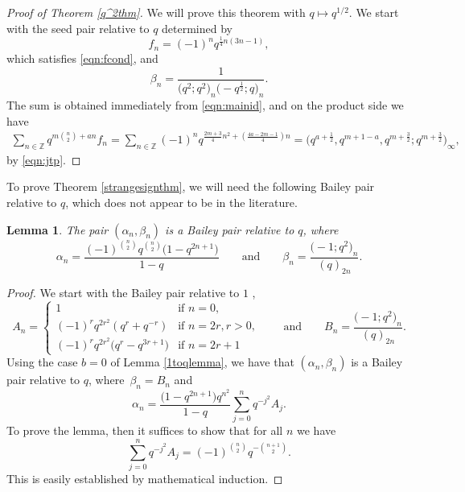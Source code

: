 \documentclass[pdftex]{sigma}
\newtheorem{Lemma}[Theorem]{Lemma}
\numberwithin{equation}{section}
\newcommand{\ZZ}{\mathbb{Z}}
\begin{document}
\begin{proof}[Proof of Theorem \ref{q^2thm}]
	We will prove this theorem with $q\mapsto q^{1/2}$.
	We start with the seed pair relative to $q$ \cite[equation~(4.4)]{Wa1} determined by
	\begin{equation} \label{eqn:fn2}
		f_n = (-1)^nq^{\frac{1}{4}n(3n-1)},
	\end{equation}
	which satisfies \eqref{eqn:fcond},
	and
	\begin{equation*}
		\beta_n = \frac{1}{\bigl(q^2;q^2\bigr)_n\bigl(-q^{\frac{1}{2}};q\bigr)_n}.
	\end{equation*}
	The sum is obtained immediately from \eqref{eqn:mainid}, and on the product side we have
	\begin{align*}
		\sum_{n\in\ZZ}q^{m\binom{n}{2}+an}f_n =
		\sum_{n\in\ZZ}(-1)^nq^{\frac{2m+3}{4}n^2+(\frac{4a-2m-1}{4})n }
		 =\bigl( q^{a+\frac{1}{2}} , q^{m+1-a} , q^{m+\frac{3}{2}};q^{m+\frac{3}{2}}\bigr)_\infty,
	\end{align*}		
	by \eqref{eqn:jtp}.
\end{proof}


To prove Theorem \ref{strangesignthm}, we will need the following Bailey pair relative to $q$, which does not appear to be in the literature.

\begin{Lemma} \label{newpair}
	The pair $(\alpha_n,\beta_n)$ is a Bailey pair relative to $q$, where
	\begin{equation*}
		\alpha_n = \frac{(-1)^{\binom{n}{2}}q^{\binom{n}{2}}\bigl(1-q^{2n+1}\bigr)}{1-q}
	\qquad
	\text{and}
	\qquad
		\beta_n = \frac{\bigl(-1;q^2\bigr)_n}{(q)_{2n}}.
	\end{equation*}
\end{Lemma}

\begin{proof}
	We start with the Bailey pair relative to $1$ \cite[p.~470, line 7]{Sl1},
	\begin{equation*}
		A_n =
		\begin{cases}
			1 &\text{if $n=0$}, \\
			(-1)^rq^{2r^2}(q^r + q^{-r}) &\text{if $n = 2r, r >0$},\\
			(-1)^rq^{2r^2}\bigl(q^r - q^{3r+1}\bigr) &\text{if $n = 2r+1$}
		\end{cases}
	\qquad
	\text{and}
	\qquad
		B_n = \frac{\bigl(-1;q^2\bigr)_n}{(q)_{2n}}.
	\end{equation*}
	Using the case $b=0$ of Lemma \ref{1toqlemma}, we have that $(\alpha_n,\beta_n)$ is a Bailey pair relative to $q$, where~${\beta_n = B_n}$ and
	\begin{equation*}
		\alpha_n = \frac{\bigl(1-q^{2n+1}\bigr)q^{n^2}}{1-q} \sum_{j=0}^n q^{-j^2}A_j.
	\end{equation*}
	To prove the lemma, then it suffices to show that for all $n$ we have
	\begin{equation*}
		\sum_{j=0}^n q^{-j^2}A_j = (-1)^{\binom{n}{2}} q^{-\binom{n+1}{2}}.
	\end{equation*}
	This is easily established by mathematical induction.
\end{proof}
\end{document}
